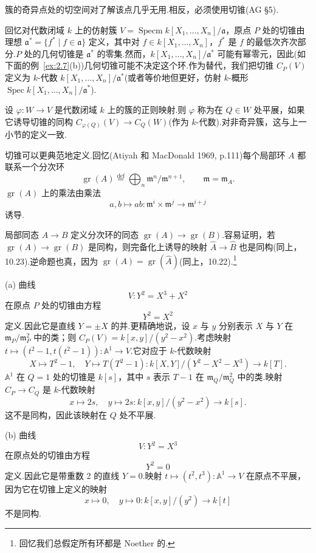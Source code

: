 簇的奇异点处的切空间对了解该点几乎无用.相反，必须使用切锥(AG \S 5).

回忆对代数闭域 $k$ 上的仿射簇 $V = \operatorname{Specm} k[X_1, \ldots, X_n]/\mathfrak{a}$，原点 $P$ 处的切锥由理想 $\mathfrak{a}^{*} = \{f^{*} \mid f \in \mathfrak{a}\}$ 定义，其中对 $f \in k[X_1, \ldots, X_n]$，$f^{*}$ 是 $f$ 的最低次齐次部分.$P$ 处的几何切锥是 $\mathfrak{a}^{*}$ 的零集.然而，$k[X_1, \ldots, X_n]/\mathfrak{a}^{*}$ 可能有幂零元，因此(如下面的例~\ref{ex:2.7}(b))几何切锥可能不决定这个环.作为替代，我们把切锥 $C_{P}(V)$ 定义为 $k$-代数 $k[X_1, \ldots, X_n]/\mathfrak{a}^{*}$(或者等价地但更好，仿射 $k$-概形 $\operatorname{Spec} k[X_1, \ldots, X_n]/\mathfrak{a}^{*}$).

设 $\varphi \colon W \to V$ 是代数闭域 $k$ 上的簇的正则映射.则 $\varphi$ 称为在 $Q \in W$ 处平展，如果它诱导切锥的同构 $C_{\varphi(Q)}(V) \to C_{Q}(W)$(作为 $k$-代数).对非奇异簇，这与上一小节的定义一致.

切锥可以更典范地定义.回忆(Atiyah 和 MacDonald 1969, p.111)每个局部环 $A$ 都联系一个分次环
\[
\operatorname{gr}(A) \overset{\mathrm{def}}{=} \bigoplus_{n} \mathfrak{m}^{n}/\mathfrak{m}^{n+1}, \qquad \mathfrak{m} = \mathfrak{m}_{A}.
\]
$\operatorname{gr}(A)$ 上的乘法由乘法
\[
a, b \mapsto ab \colon \mathfrak{m}^{i} \times \mathfrak{m}^{j} \to \mathfrak{m}^{i+j}
\]
诱导.

局部同态 $A \to B$ 定义分次环的同态 $\operatorname{gr}(A) \to \operatorname{gr}(B)$.容易证明，若 $\operatorname{gr}(A) \to \operatorname{gr}(B)$ 是同构，则完备化上诱导的映射 $\widehat{A} \to \widehat{B}$ 也是同构(同上，10.23).逆命题也真，因为 $\operatorname{gr}(A) = \operatorname{gr}(\widehat{A})$(同上，10.22).\footnote{回忆我们总假定所有环都是 Noether 的.}

\begin{example}\label{ex:2.7}
(a) 曲线
\[
V \colon Y^{2} = X^{3} + X^{2}
\]
在原点 $P$ 处的切锥由方程
\[
Y^{2} = X^{2}
\]
定义.因此它是直线 $Y = \pm X$ 的并.更精确地说，设 $x$ 与 $y$ 分别表示 $X$ 与 $Y$ 在 $\mathfrak{m}_{P}/\mathfrak{m}^{2}_{P}$ 中的类；则 $C_{P}(V) = k[x, y]/(y^{2} - x^{2})$.考虑映射 $t \mapsto (t^{2} - 1, t(t^{2} - 1)) \colon \mathbb{A}^{1} \to V$.它对应于 $k$-代数映射
\[
X \mapsto T^{2} - 1, \quad Y \mapsto T(T^{2} - 1) \colon k[X, Y]/(Y^{2} - X^{2} - X^{3}) \to k[T].
\]
$\mathbb{A}^{1}$ 在 $Q = 1$ 处的切锥是 $k[s]$，其中 $s$ 表示 $T - 1$ 在 $\mathfrak{m}_{Q}/\mathfrak{m}^{2}_{Q}$ 中的类.映射 $C_{P} \to C_{Q}$ 是 $k$-代数映射
\[
x \mapsto 2s, \quad y \mapsto 2s \colon k[x, y]/(y^{2} - x^{2}) \to k[s].
\]
这不是同构，因此该映射在 $Q$ 处不平展.

(b) 曲线
\[
V \colon Y^{2} = X^{3}
\]
在原点处的切锥由方程
\[
Y^{2} = 0
\]
定义.因此它是带重数 2 的直线 $Y = 0$.映射 $t \mapsto (t^{2}, t^{3}) \colon \mathbb{A}^{1} \to V$ 在原点不平展，因为它在切锥上定义的映射
\[
x \mapsto 0, \quad y \mapsto 0 \colon k[x, y]/(y^{2}) \to k[t]
\]
不是同构.
\end{example}

